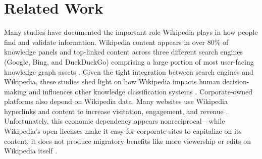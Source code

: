 \section{Related Work}
Many studies have documented the important role Wikipedia plays in how people find and validate information. Wikipedia content appears in over 80\% of knowledge panels and top-linked content across three different search engines (Google, Bing, and DuckDuckGo) comprising a large portion of most user-facing knowledge graph assets \cite{mcmahon_substantial_2017,vincent_deeper_2021,vincent_examining_2018}. Given the tight integration between search engines and Wikipedia, these studies shed light on how Wikipedia impacts human decision-making and influences other knowledge classification systems \cite{lerner_knowledge_2018,c_thompson_user-generated_2024,formisano_counter-misinformation_2024}. Corporate-owned platforms also depend on Wikipedia data. Many websites use Wikipedia hyperlinks and content to increase visitation, engagement, and revenue \cite{gomezmartinez_wikipedia_2022,lerner_knowledge_2018,moyer_determining_2015,vincent_examining_2018}.  Unfortunately, this economic dependency appears nonreciprocal---while Wikipedia’s open licenses make it easy for corporate sites to capitalize on its content, it does not produce migratory benefits like more viewership or edits on Wikipedia itself \cite{vincent_examining_2018}. 

